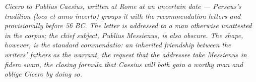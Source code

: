 
\textit{Cicero to Publius Caesius, written at Rome at an
uncertain date --- Perseus's tradition (\textit{loco et anno
incerto}) groups it with the recommendation letters and
provisionally before 56 BC. The letter is addressed to a man
otherwise unattested in the corpus; the chief subject, Publius
Messienus, is also obscure. The shape, however, is the
standard \textit{commendatio}: an inherited friendship between
the writers' fathers as the warrant, the request that the
addressee take Messienus \textit{in fidem suam}, the closing
formula that Caesius will both gain a worthy man and oblige
Cicero by doing so.}
